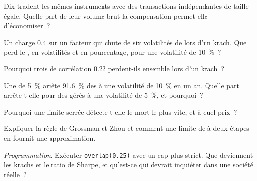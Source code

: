 \begin{exercise}[$\star$]\label{exo:s1:running-a-multi-strategy-book:1}
Dix  tradent les mêmes instruments avec des transactions indépendantes de taille égale. Quelle part de leur volume brut la compensation permet-elle d'économiser~?
\end{exercise}

\begin{exercise}[$\star$]\label{exo:s1:running-a-multi-strategy-book:2}
Un  charge 0.4 sur un facteur qui chute de six volatilités de  lors d'un krach. Que perd le , en volatilités et en pourcentage, pour une volatilité de 10~\%~?
\end{exercise}

\begin{exercise}[$\star$]\label{exo:s1:running-a-multi-strategy-book:3}
Pourquoi trois  de corrélation 0.22 perdent-ils ensemble lors d'un krach~?
\end{exercise}

\begin{exercise}[$\star\star$]\label{exo:s1:running-a-multi-strategy-book:4}
Une  de 5~\% arrête 91.6~\% des  à une volatilité de 10~\% en un an. Quelle part arrête-t-elle pour des  gérés à une volatilité de 5~\%, et pourquoi~?
\end{exercise}

\begin{exercise}[$\star\star$]\label{exo:s1:running-a-multi-strategy-book:5}
Pourquoi une limite serrée détecte-t-elle le  mort le plus vite, et à quel prix~?
\end{exercise}

\begin{exercise}[$\star\star$]\label{exo:s1:running-a-multi-strategy-book:6}
Expliquer la règle de Grossman et Zhou et comment une limite de  à deux étapes en fournit une approximation.
\end{exercise}

\begin{exercise}[$\star\star\star$]\label{exo:s1:running-a-multi-strategy-book:7}
\emph{Programmation.} Exécuter \texttt{overlap(0.25)} avec un cap plus strict. Que deviennent les krachs et le ratio de Sharpe, et qu'est-ce qui devrait inquiéter dans une
société réelle~?
\end{exercise}

